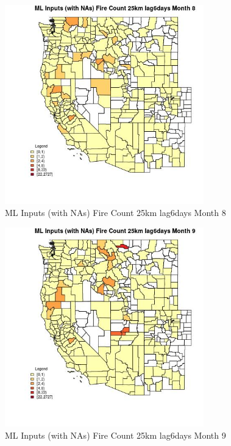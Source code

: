 \begin{figure} 
\centering  
\includegraphics[width=0.77\textwidth]{Code_Outputs/Report_ML_input_PM25_Step4_part_f_de_duplicated_aveswNAs_CountyFire_Count_25km_lag6daysmedianMonth8.jpg} 
\caption{\label{fig:Report_ML_input_PM25_Step4_part_f_de_duplicated_aveswNAsCountyFire_Count_25km_lag6daysmedianMonth8}ML Inputs (with NAs) Fire Count 25km lag6days Month 8} 
\end{figure} 
 

\begin{figure} 
\centering  
\includegraphics[width=0.77\textwidth]{Code_Outputs/Report_ML_input_PM25_Step4_part_f_de_duplicated_aveswNAs_CountyFire_Count_25km_lag6daysmedianMonth9.jpg} 
\caption{\label{fig:Report_ML_input_PM25_Step4_part_f_de_duplicated_aveswNAsCountyFire_Count_25km_lag6daysmedianMonth9}ML Inputs (with NAs) Fire Count 25km lag6days Month 9} 
\end{figure} 
 

